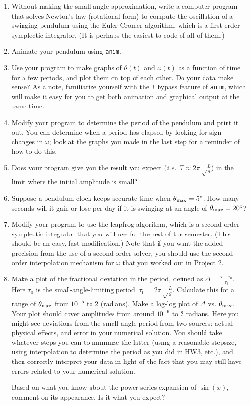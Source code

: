 \documentclass[12pt]{article}
\newcommand{\ie}{{\em i.e.\ }}
\begin{document}
\begin{enumerate}

\item Without making the small-angle approximation, 
write a computer program that solves Newton's law (rotational form) to compute the oscillation of a swinging pendulum using the Euler-Cromer algorithm, which 
is a first-order symplectic integrator. (It is perhaps the easiest to code of all of them.)

\item Animate your pendulum using {\tt anim}.

\item Use your program to make graphs of $\theta(t)$ and $\omega(t)$ as a function of time for a few periods, and plot them on top of each other. Do your 
data make sense? As a note, familiarize yourself with the {\tt !} bypass feature of {\tt anim}, which will make it easy for you to get both animation and graphical
output at the same time.

\item Modify your program to determine the period of the pendulum and print it out. You can determine when a period has elapsed by looking for sign changes in $\omega$; look at the graphs you 
made in the last step for a reminder of how to do this.

\item Does your program give you the result you expect (\ie $T \approx 2\pi\sqrt\frac{L}{g}$) in the limit where the initial amplitude is small?

\item Suppose a pendulum clock keeps accurate time when $\theta_{\rm max}=5^\circ$. How many seconds will it gain or lose per day if it is swinging at an angle of  $\theta_{\rm max}=20^\circ$?

\item Modify your program to use the leapfrog algorithm, which is a second-order symplectic integrator that you will use for the rest of the semester. (This should be an easy, fast modification.) Note that if you want the added precision from the
use of a second-order solver, you should use the second-order interpolation mechanism for $\omega$ that you worked out in Project 2.

\item Make a plot of the fractional deviation in the period, defined as $\Delta = \frac{\tau-\tau_0}{\tau_0}$. Here $\tau_0$ is the small-angle-limiting period, $\tau_0=2\pi\sqrt\frac{L}{g}$. Calculate this for a range of $\theta_{\rm max}$ from $10^{-5}$ to 2 (radians). Make a log-log plot of $\Delta$ vs. $\theta_{\rm max}$. Your plot should
cover amplitudes from around $10^{-6}$ to 2 radians. Here you might see
deviations from the small-angle period from two sources: actual physical effects, and error in your numerical solution. You should take whatever steps you can to minimize
the latter (using a reasonable stepsize, using interpolation to determine the period as you did in HW3, etc.), and then correctly interpret your data in light of the fact
that you may still have errors related to your numerical solution.

Based on what you know about the power series expansion of $\sin(x)$, comment on its appearance. Is it what you expect?


\end{enumerate}
\end{document}
